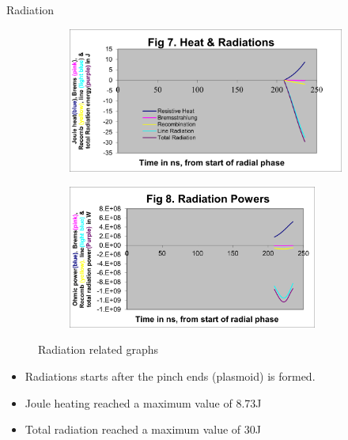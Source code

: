 \begin{frame} {Radiation}
    \begin{figure}
        \centering
        \begin{subfigure}{0.5\textwidth}
            \includegraphics[width=\textwidth]{figures/figure7.png}
        \end{subfigure}%
        \begin{subfigure}{0.5\textwidth}
            \includegraphics[width=0.9\textwidth]{figures/figure8.png}
        \end{subfigure}
        \caption{Radiation related graphs}
        \label{fig:radiation}
    \end{figure}
    \begin{itemize}
        \item Radiations starts after the pinch ends (plasmoid) is formed.
        \item Joule heating reached a maximum value of 8.73\unit{\J}
        \item Total radiation reached a maximum value of 30\unit{\J}
    \end{itemize}
\end{frame}